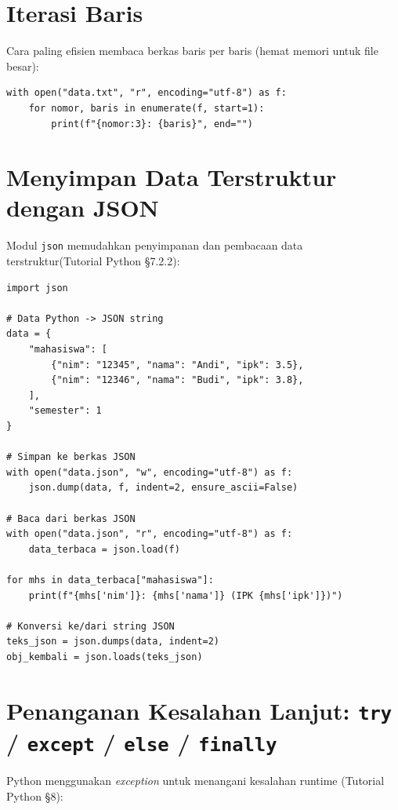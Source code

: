 \documentclass[../main.tex]{subfiles}
\begin{document}
\section{Iterasi Baris}

Cara paling efisien membaca berkas baris per baris (hemat memori untuk file besar):

\begin{lstlisting}[caption=Iterasi baris -- cara paling efisien]
with open("data.txt", "r", encoding="utf-8") as f:
    for nomor, baris in enumerate(f, start=1):
        print(f"{nomor:3}: {baris}", end="")
\end{lstlisting}

\section{Menyimpan Data Terstruktur dengan JSON}

Modul \texttt{json} memudahkan penyimpanan dan pembacaan data terstruktur\newline (Tutorial Python §7.2.2):

\begin{lstlisting}[caption=Membaca dan menulis JSON]
import json

# Data Python -> JSON string
data = {
    "mahasiswa": [
        {"nim": "12345", "nama": "Andi", "ipk": 3.5},
        {"nim": "12346", "nama": "Budi", "ipk": 3.8},
    ],
    "semester": 1
}

# Simpan ke berkas JSON
with open("data.json", "w", encoding="utf-8") as f:
    json.dump(data, f, indent=2, ensure_ascii=False)

# Baca dari berkas JSON
with open("data.json", "r", encoding="utf-8") as f:
    data_terbaca = json.load(f)

for mhs in data_terbaca["mahasiswa"]:
    print(f"{mhs['nim']}: {mhs['nama']} (IPK {mhs['ipk']})")

# Konversi ke/dari string JSON
teks_json = json.dumps(data, indent=2)
obj_kembali = json.loads(teks_json)
\end{lstlisting}

\section{Penanganan Kesalahan Lanjut: \texttt{try} / \texttt{except} / \texttt{else} / \texttt{finally}}

Python menggunakan \textit{exception} untuk menangani kesalahan runtime (Tutorial Python §8):
\end{document}
